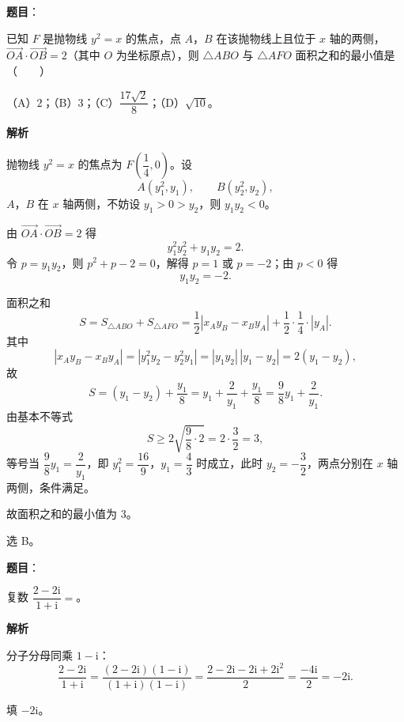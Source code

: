 \begin{answer}

\textbf{题目}：

已知 $F$ 是抛物线 $y^2=x$ 的焦点，点 $A$，$B$ 在该抛物线上且位于 $x$ 轴的两侧，$\overrightarrow{OA}\cdot\overrightarrow{OB}=2$（其中 $O$ 为坐标原点），则 $\triangle ABO$ 与 $\triangle AFO$ 面积之和的最小值是\mbox{（　　）}

（A）$2$；（B）$3$；（C）$\dfrac{17\sqrt2}8$；（D）$\sqrt{10}$。

\textbf{解析}

抛物线 $y^2=x$ 的焦点为 $F\left(\dfrac14,0\right)$。设
\nopagebreak[4]
\[A(y_1^2,y_1),\qquad B(y_2^2,y_2),\]
$A$，$B$ 在 $x$ 轴两侧，不妨设 $y_1>0>y_2$，则 $y_1y_2<0$。

由 $\overrightarrow{OA}\cdot\overrightarrow{OB}=2$ 得
\nopagebreak[4]
\[y_1^2y_2^2+y_1y_2=2 .\]
令 $p=y_1y_2$，则 $p^2+p-2=0$，解得 $p=1$ 或 $p=-2$；由 $p<0$ 得
\nopagebreak[4]
\[y_1y_2=-2 .\]

面积之和
\nopagebreak[4]
\[S=S_{\triangle ABO}+S_{\triangle AFO}
=\frac12\left|x_Ay_B-x_By_A\right|+\frac12\cdot\frac14\cdot|y_A| .\]
其中
\nopagebreak[4]
\[\left|x_Ay_B-x_By_A\right|=\left|y_1^2y_2-y_2^2y_1\right|
=|y_1y_2|\,|y_1-y_2|=2(y_1-y_2),\]
故
\nopagebreak[4]
\[S=(y_1-y_2)+\frac{y_1}8
=y_1+\frac{2}{y_1}+\frac{y_1}8=\frac98y_1+\frac2{y_1} .\]
由基本不等式
\nopagebreak[4]
\[S\geqslant 2\sqrt{\frac98\cdot 2}=2\cdot\frac32=3,\]
等号当 $\dfrac98y_1=\dfrac2{y_1}$，即 $y_1^2=\dfrac{16}9$，$y_1=\dfrac43$ 时成立，此时 $y_2=-\dfrac32$，两点分别在 $x$ 轴两侧，条件满足。

故面积之和的最小值为 $3$。

选 B。


\end{answer}
\begin{answer}

\textbf{题目}：

复数 $\dfrac{2-2\mathrm i}{1+\mathrm i}=$\gkblank{}。

\textbf{解析}

分子分母同乘 $1-\mathrm i$：
\nopagebreak[4]
\[\frac{2-2\mathrm i}{1+\mathrm i}
=\frac{(2-2\mathrm i)(1-\mathrm i)}{(1+\mathrm i)(1-\mathrm i)}
=\frac{2-2\mathrm i-2\mathrm i+2\mathrm i^2}{2}
=\frac{-4\mathrm i}{2}=-2\mathrm i .\]

填 $-2\mathrm i$。


\end{answer}
